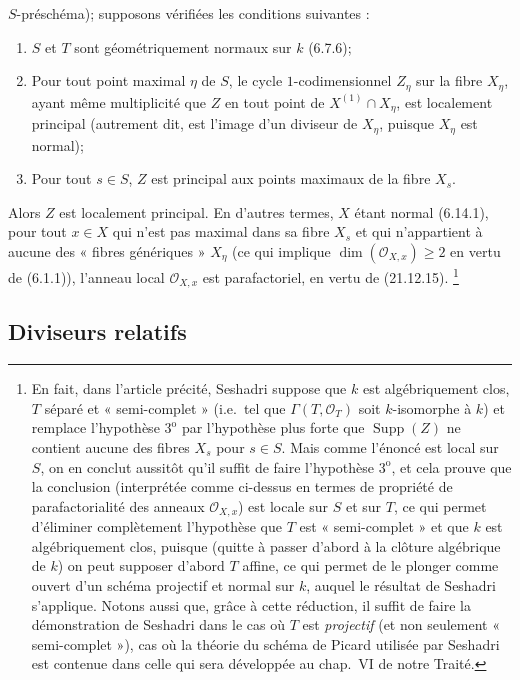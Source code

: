 \begin{env}[21.14.4]
$S$-préschéma); supposons vérifiées les conditions suivantes :
\begin{enumerate}[label=\arabic*\textsuperscript{o}]
  \item $S$ et $T$ sont géométriquement normaux sur $k$ (6.7.6);
  \item Pour tout point maximal $\eta$ de $S$, le cycle $1$-codimensionnel $Z_\eta$
  sur la fibre $X_\eta$, ayant même multiplicité que $Z$ en tout point de
  $X^{(1)}\cap X_\eta$, est localement principal (autrement dit, est l'image d'un
  diviseur de $X_\eta$, puisque $X_\eta$ est normal);
  \item Pour tout $s\in S$, $Z$ est principal aux points maximaux de la fibre $X_s$.
\end{enumerate}
Alors $Z$ est localement principal. En d'autres termes, $X$ étant normal (6.14.1),
pour tout $x\in X$ qui n'est pas maximal dans sa fibre $X_s$ et qui n'appartient à
aucune des « fibres génériques » $X_\eta$ (ce qui implique
$\dim(\mathcal O_{X,x})\geq2$ en vertu de (6.1.1)), l'anneau local
$\mathcal O_{X,x}$ est parafactoriel, en vertu de (21.12.15).
\footnote{En fait, dans l'article précité, Seshadri suppose que $k$ est algébriquement
clos, $T$ séparé et « semi-complet » (i.e.\ tel que
$\Gamma(T,\mathcal O_T)$ soit $k$-isomorphe à $k$) et remplace l'hypothèse
$3^{\mathrm o}$ par l'hypothèse plus forte que $\operatorname{Supp}(Z)$ ne contient
aucune des fibres $X_s$ pour $s\in S$. Mais comme l'énoncé est local sur $S$, on en
conclut aussitôt qu'il suffit de faire l'hypothèse $3^{\mathrm o}$, et cela prouve que
la conclusion (interprétée comme ci-dessus en termes de propriété de parafactorialité
des anneaux $\mathcal O_{X,x}$) est locale sur $S$ et sur $T$, ce qui permet
d'éliminer complètement l'hypothèse que $T$ est « semi-complet » et que $k$ est
algébriquement clos, puisque (quitte à passer d'abord à la clôture algébrique de $k$)
on peut supposer d'abord $T$ affine, ce qui permet de le plonger comme ouvert d'un
schéma projectif et normal sur $k$, auquel le résultat de Seshadri s'applique. Notons
aussi que, grâce à cette réduction, il suffit de faire la démonstration de Seshadri dans
le cas où $T$ est \emph{projectif} (et non seulement « semi-complet »), cas où la
théorie du schéma de Picard utilisée par Seshadri est contenue dans celle qui sera
développée au chap.~VI de notre Traité.}
\end{env}

\subsection{Diviseurs relatifs}
\label{IV.21.15}

